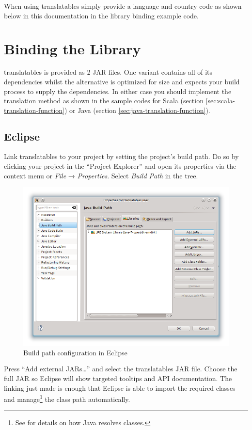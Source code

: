 \documentclass[a4paper,11pt,twoside]{report}
\begin{document}
When using translatables simply provide a language and country code as shown below in this documentation in the library binding example code.

\section{Binding the Library}\label{sec:library-binding}
translatables is provided as 2 \ac{JAR} files. One variant contains all of its dependencies whilst the alternative is optimized for size and expects your build process to supply the dependencies. In either case you should implement the translation method as shown in the sample codes for Scala (section \vref{sec:scala-translation-function}) or Java (section \vref{sec:java-translation-function}).

\subsection{Eclipse}
Link translatables to your project by setting the project's build path. Do so by clicking your project in the “Project Explorer” and open its properties via the context menu or \textit{File} → \textit{Properties}. Select \textit{Build Path} in the tree.
\begin{figure}
	\centering
	\includegraphics[width=\textwidth]{./images/build-path.png}
	\caption{Build path configuration in Eclipse}
\end{figure}
Press “Add external JARs…” and select the translatables \ac{JAR} file. Choose the full \ac{JAR} so Eclipse will show targeted tooltips and \ac{API} documentation. The linking just made is enough that Eclipse is able to import the required classes and manage\footnote{See \cite{java-class-resolving} for details on how Java resolves classes.} the class path automatically.
\end{document}
